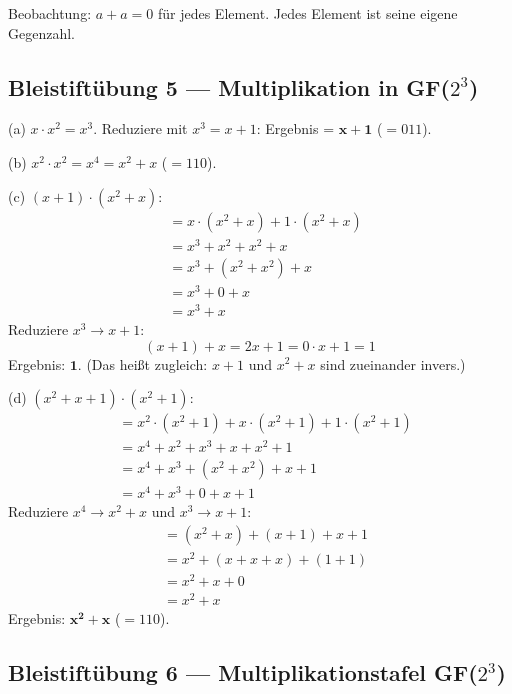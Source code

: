 Beobachtung: $a + a = 0$ für jedes Element. Jedes Element ist seine
eigene Gegenzahl.

\subsection*{Bleistiftübung 5 — Multiplikation in GF($2^3$)}

(a) $x \cdot x^2 = x^3$. Reduziere mit $x^3 = x + 1$: Ergebnis =
$\mathbf{x + 1}$ ($= 011$).

(b) $x^2 \cdot x^2 = x^4 = x^2 + x$ ($= 110$).

(c) $(x+1) \cdot (x^2+x)$:
\begin{align*}
  &= x \cdot (x^2+x) + 1 \cdot (x^2+x) \\
  &= x^3+x^2 + x^2+x \\
  &= x^3 + (x^2 + x^2) + x \\
  &= x^3 + 0 + x \\
  &= x^3 + x
\end{align*}
Reduziere $x^3 \to x+1$:
\[
  (x+1) + x = 2x + 1 = 0 \cdot x + 1 = 1
\]
Ergebnis: $\mathbf{1}$. (Das heißt zugleich: $x+1$ und $x^2+x$ sind
zueinander invers.)

(d) $(x^2+x+1) \cdot (x^2+1)$:
\begin{align*}
  &= x^2 \cdot (x^2+1) + x \cdot (x^2+1) + 1 \cdot (x^2+1) \\
  &= x^4+x^2 + x^3+x + x^2+1 \\
  &= x^4 + x^3 + (x^2+x^2) + x + 1 \\
  &= x^4 + x^3 + 0 + x + 1
\end{align*}
Reduziere $x^4 \to x^2+x$ und $x^3 \to x+1$:
\begin{align*}
  &= (x^2+x) + (x+1) + x + 1 \\
  &= x^2 + (x+x+x) + (1+1) \\
  &= x^2 + x + 0 \\
  &= x^2 + x
\end{align*}
Ergebnis: $\mathbf{x^2 + x}$ ($= 110$).

\subsection*{Bleistiftübung 6 — Multiplikationstafel GF($2^3$)}

